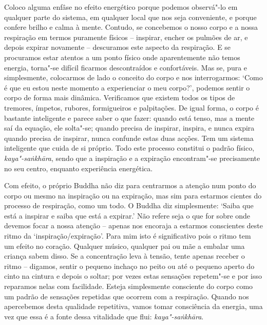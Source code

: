 \enlargethispage{\baselineskip}

Coloco alguma enfâse no efeito energético porque podemos observá"-lo em qualquer
parte do sistema, em qualquer local que nos seja conveniente, e porque confere
brilho e calma à mente. Contudo, se concebemos o nosso corpo e a nossa
respiração em termos puramente físicos -- inspirar, encher os pulmões de ar, e
depois expirar novamente -- descuramos este aspecto da respiração. E se
procuramos estar atentos a um ponto físico onde aparentemente não temos energia,
torna"-se difícil ficarmos descontraídos e confortáveis. Mas se, pura e
simplesmente, colocarmos de lado o conceito do corpo e nos interrogarmos: `Como
é que eu estou neste momento a experienciar o meu corpo?', podemos sentir o
corpo de forma mais dinâmica. Verificamos que existem todos os tipos de
tremores, ímpetos, rubores, formigueiros e palpitações. De igual forma, o corpo
é bastante inteligente e parece saber o que fazer: quando está tenso, mas a
mente saí da equação, ele solta"-se; quando precisa de inspirar, inspira, e nunca
expira quando precisa de inspirar, nunca confunde estas duas acções. Tem um
sistema inteligente que cuida de si próprio. Todo este processo constitui o
padrão físico, \emph{kaya"-saṅkhāra}, sendo que a inspiração e a expiração
encontram"-se precisamente no seu centro, enquanto experiência energética.

\enlargethispage{\baselineskip}

Com efeito, o próprio Buddha não diz para centrarmos a atenção num ponto do
corpo ou mesmo na inspiração ou na expiração, mas sim para estarmos cientes do
processo de respiração, como um todo. O Buddha diz simplesmente: `Saiba que está
a inspirar e saiba que está a expirar.'
Não refere seja o que for sobre onde devemos focar a nossa atenção -- apenas nos
encoraja a estarmos conscientes deste ritmo da `inspiração/expiração'. Para mim
isto é significativo pois o ritmo tem um efeito no coração. Qualquer músico,
qualquer pai ou mãe a embalar uma criança sabem disso. Se a concentração leva à
tensão, tente apenas receber o ritmo -- digamos, sentir o pequeno inchaço no
peito ou até o pequeno aperto do cinto na cintura e depois o soltar; por vezes
estas sensações repetem"-se e por isso reparamos nelas com facilidade. Esteja
simplesmente consciente do corpo como um padrão de sensações repetidas que
ocorrem com a respiração. Quando nos apercebemos desta qualidade repetitiva,
vamos tomar consciência da energia, uma vez que essa é a fonte dessa vitalidade
que flui: \emph{kaya"-saṅkhāra}.

